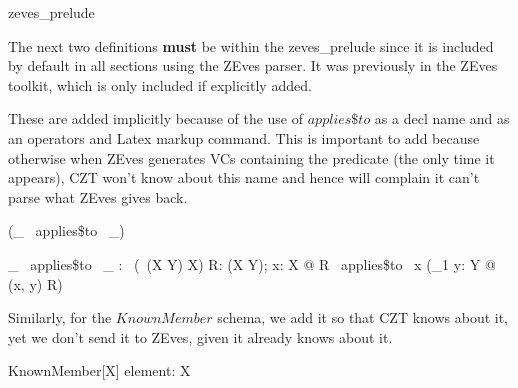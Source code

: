 \begin{zsection}
  \SECTION zeves\_prelude
\end{zsection}





The next two definitions \textbf{must} be within the \textsf{zeves\_prelude} since it is
included by default in all sections using the ZEves parser. It was previously in the ZEves
toolkit, which is only included if explicitly added.

These are added implicitly because of the use of $applies\$to$ as a decl name and as an 
operators and Latex markup command. This is important to add because otherwise when ZEves
generates VCs containing the predicate (the only time it appears), CZT won't know about 
this name and hence will complain it can't parse what ZEves gives back.
%
\begin{zed}
   \relation (\_ ~applies\$to~ \_)
\end{zed}

\begin{gendef}[X, Y]
   \_ ~applies\$to~ \_ : \power~(\power~(X \cross Y) \cross X)
\where
   \forall R: \power(X \cross Y); x: X @ R ~applies\$to~ x \iff (\exists_1 y: Y @ (x, y) \in R)
\end{gendef}

Similarly, for the $KnownMember$ schema, we add it so that CZT knows about it, yet
we don't send it to ZEves, given it already knows about it.
%
\begin{schema}{KnownMember}[X]
	element: X
\end{schema}